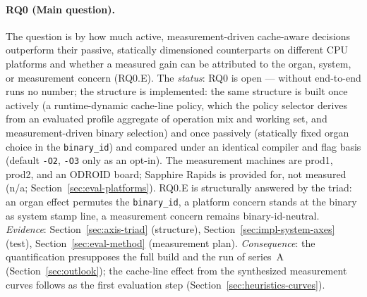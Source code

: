 \begin{nurkurz}
\paragraph{RQ0 (Main question).} The question is by how much active, measurement-driven cache-aware
decisions outperform their passive, statically dimensioned counterparts on different CPU platforms and
whether a measured gain can be attributed to the organ, system, or measurement concern (RQ0.E). The
\emph{status}: RQ0 is open --- without end-to-end runs no number; the structure is implemented: the same
structure is built once actively (a runtime-dynamic cache-line policy, which the policy selector derives
from an evaluated profile aggregate of operation mix and working set, and measurement-driven binary
selection) and once passively (statically fixed organ choice in the \texttt{binary\_id}) and compared under
an identical compiler and flag basis (default \texttt{-O2}, \texttt{-O3} only as an opt-in). The
measurement machines are prod1, prod2, and an ODROID board; Sapphire Rapids is provided for, not measured
(n/a; Section~\ref{sec:eval-platforms}). RQ0.E is structurally answered by the triad: an organ effect
permutes the \texttt{binary\_id}, a platform concern stands at the binary as system stamp line, a
measurement concern remains binary-id-neutral.
\emph{Evidence}: Section~\ref{sec:axis-triad} (structure),
Section~\ref{sec:impl-system-axes} (test), Section~\ref{sec:eval-method} (measurement plan).
\emph{Consequence}: the quantification presupposes the full build and the run of series~A
(Section~\ref{sec:outlook}); the cache-line effect from the synthesized measurement curves follows as the
first evaluation step (Section~\ref{sec:heuristics-curves}).
\end{nurkurz}

